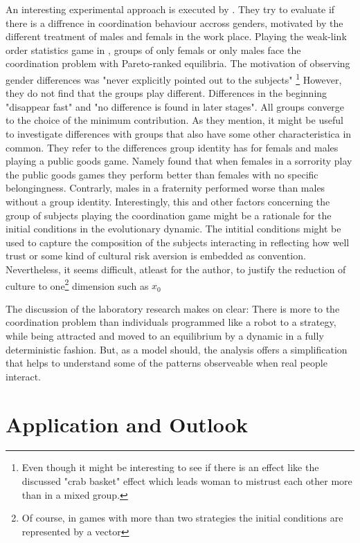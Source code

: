 \documentclass[12pt]{article}
\begin{document}
An interesting experimental approach is executed by 
\cite{dufwenberg_gender_2005}. They try to evaluate if there is a diffrence
in coordination behaviour accross genders, motivated by the different
treatment of males and femals in the work place. Playing the weak-link order
statistics game in \cite{van_huyck_tacit_1990}, groups of only femals or only
males face the coordination problem with Pareto-ranked equilibria. The 
motivation of observing gender differences was "never explicitly pointed 
out to the subjects" \parencite{dufwenberg_gender_2005}\footnote{
Even though it might be interesting to see if there is an effect like 
the discussed "crab basket" effect which leads woman to mistrust each other 
more than in a mixed group.} However, they do not find that the groups play
different. Differences in the beginning "disappear fast" and "no difference
is found in later stages". All groups converge to the choice of the minimum
contribution. As they mention, it might be useful to investigate differences
with groups that also have some other characteristica in common. They refer
to the differences group identity has for femals and males playing a 
public goods game. Namely \textcite{croson_groups_2008} found that when
females in a sorrority play the public goods games they perform better than 
females with no specific belongingness. Contrarly, males in a fraternity 
performed worse than males without a group identity. 
Interestingly, this and other factors concerning the group of subjects 
playing the coordination game might be a rationale for the initial conditions
in the evolutionary dynamic. The intitial conditions might be used to 
capture the composition of the subjects interacting in reflecting how well
trust or some kind of cultural risk aversion is embedded as convention. 
Nevertheless, it seems difficult, atleast for the author, to justify
the reduction of culture to one\footnote{Of course, in games with more 
than two strategies the initial conditions are represented by a vector}
dimension such as $x_0$

The discussion of the laboratory research makes on clear: There is more
to the coordination problem than individuals programmed like a robot 
to a strategy, while being attracted and moved to an equilibrium by a dynamic
in a fully deterministic fashion. But, as a model should, the analysis offers 
a simplification that helps to understand some of the patterns observeable 
when real people interact.
\section{Application and Outlook}
\end{document}
